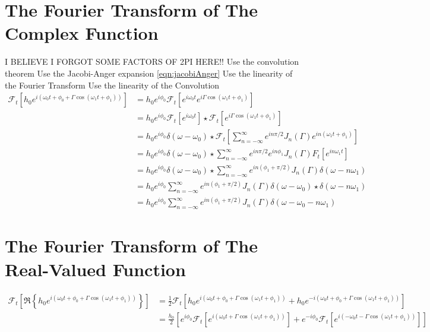 \documentclass[onecolumn, groupedaddress, 10pt]{revtex4-1}
\begin{document}
\section{The Fourier Transform of The Complex Function}
I BELIEVE I FORGOT SOME FACTORS OF 2PI HERE!!
Use the convolution theorem
Use the Jacobi-Anger expansion \ref{eqn:jacobiAnger}
Use the linearity of the Fourier Transform
Use the linearity of the Convolution
\begin{align}
\mathcal{F}_t \left[ h_0 e^{i\left( \omega_0 t + \phi_0 + \Gamma \cos( \omega_1 t + \phi_1 ) \right)} \right]
&= h_0 e^{i\phi_0} \mathcal{F}_t \left[ e^{i\omega_0 t} e^{i\Gamma \cos(\omega_1 t + \phi_1)} \right]											\\
&= h_0 e^{i\phi_0} \mathcal{F}_t \left[ e^{i\omega_0 t} \right] \star \mathcal{F}_t \left[ e^{i\Gamma \cos(\omega_1 t + \phi_1)} \right]		\\
&= h_0 e^{i\phi_0} \delta(\omega - \omega_0) 
			\star \mathcal{F}_t \left[ \sum_{n=-\infty}^{\infty} e^{in\pi/2} J_n(\Gamma) e^{in(\omega_1 t + \phi_1)} \right]							\\
&= h_0 e^{i\phi_0} \delta(\omega - \omega_0) \star \sum_{n=-\infty}^{\infty} e^{in\pi/2} e^{in\phi_1} J_n(\Gamma) F_t \left[ e^{in\omega_1 t} \right]	\\
&= h_0 e^{i\phi_0} \delta(\omega - \omega_0) \star \sum_{n=-\infty}^{\infty} e^{in(\phi_1 + \pi/2)} J_n(\Gamma) \delta(\omega - n\omega_1)			\\
&= h_0 e^{i\phi_0} \sum_{n=-\infty}^{\infty} e^{in(\phi_1 + \pi/2)} J_n(\Gamma)  \delta(\omega - \omega_0) \star \delta(\omega - n\omega_1)			\\
&= h_0 e^{i\phi_0} \sum_{n=-\infty}^{\infty} e^{in(\phi_1 + \pi/2)} J_n(\Gamma)  \delta(\omega - \omega_0 - n\omega_1)
\end{align}


\section{The Fourier Transform of The Real-Valued Function}

\begin{align}
\mathcal{F}_t \left[ \Re \left\{ h_0 e^{i\left( \omega_0 t + \phi_0 + \Gamma \cos( \omega_1 t + \phi_1 ) \right)} \right\} \right]
&= \frac{1}{2} \mathcal{F}_t \left[ h_0 e^{i\left( \omega_0 t + \phi_0 + \Gamma \cos( \omega_1 t + \phi_1 ) \right)} 
                        + h_0 e^{-i\left( \omega_0 t + \phi_0 + \Gamma \cos( \omega_1 t + \phi_1 ) \right)} \right]			\\
&= \frac{h_0}{2} \left[ 
  e^{ i\phi_0} \mathcal{F}_t \left[ e^{i\left(  \omega_0 t + \Gamma \cos( \omega_1 t + \phi_1 ) \right)} \right] 
+ e^{-i\phi_0} \mathcal{F}_t \left[ e^{i\left( -\omega_0 t - \Gamma \cos( \omega_1 t + \phi_1 ) \right)} \right] 
\right]
\end{align}
\end{document}
